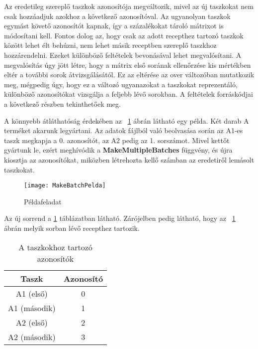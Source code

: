 Az eredetileg szereplő taszkok azonosítója megváltozik, mivel az új taszkokat nem csak hozzáadjuk azokhoz a következő azonosítóval.
Az ugyanolyan taszkok egymást követő azonosítót kapnak, így a százalékokat tároló mátrixot is módosítani kell.
Fontos dolog az, hogy csak az adott recepthez tartozó taszkok között lehet élt behúzni, nem lehet másik receptben szereplő taszkhoz hozzárendelni.
Ezeket különböző feltételek bevonásával lehet megvalósítani.
A megvalósítás úgy jött létre, hogy a mátrix  első sorának ellenőrzése kis mértékben eltér a további sorok átvizsgálásától.
Ez az eltérése az over változóban mutatkozik meg, mégpedig úgy, hogy ez a változó ugyanazokat a taszkokat reprezentáló, különböző azonosítókat vizsgálja a feljebb lévő sorokban.
A feltételek forráskódjai a következő részben tekinthetőek meg.

A könnyebb átláthatóság érdekében az ~\ref{MakeBatchPelda} ábrán látható egy példa.
Két darab A terméket akarunk legyártani.
Az adatok fájlból való beolvasása során az A1-es taszk megkapja a 0. azonosítót, az A2 pedig az 1. sorszámot.
Mivel kettőt gyártunk le, ezért meghívódik a \textbf{MakeMultipleBatches} függvény, és újra kiosztja az azonosítókat, miközben létrehozta kellő számban az eredetiről lemásolt taszkokat. 
\begin{figure}[H]
\begin{center}
\texttt{[image: MakeBatchPelda]}
\caption{Példafeladat}
\label{MakeBatchPelda}
\end{center}
\end{figure}

Az új sorrend a \ref{tab:table1} táblázatban látható.
Zárójelben pedig látható, hogy az ~\ref{MakeBatchPelda} ábrán melyik sorban lévő recepthez tartozik.
\begin{table}[H]
  \begin{center}
  	\caption{A taszkokhoz tartozó azonosítók}
  	\captionsetup[table]{skip=10pt}
    \label{tab:table1}
    \begin{tabular}{|c|c|}
      \textbf{Taszk} & \textbf{Azonosító} \\     
      \hline
      A1 (első) & 0\\
      A1 (második) & 1\\
      A2 (első) & 2\\
      A2 (második) & 3\\
    \end{tabular}
  \end{center}
\end{table}

